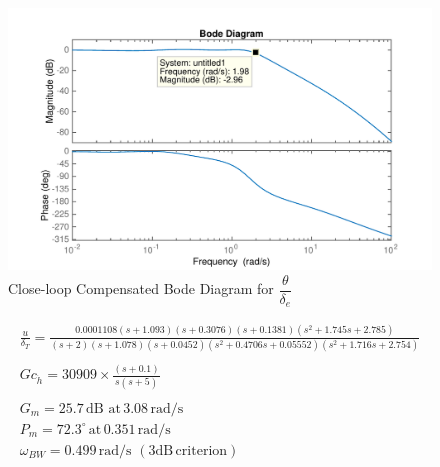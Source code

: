 \documentclass[11pt]{article}
\begin{document}
\begin{figure}[h!]
\begin{center}
\includegraphics[height=.4\textheight]{figures/close_comp_theta}
\caption{Close-loop Compensated Bode Diagram for $\dfrac{\theta}{\delta_e}$}
\end{center}
\end{figure}

\begin{gather*}
\frac{u}{\delta_T}=\frac{0.0001108 (s+1.093) (s+0.3076) (s+0.1381) (s^2 + 1.745s + 2.785)}{(s+2) (s+1.078) (s+0.0452) (s^2 + 0.4706s + 0.05552) (s^2 + 1.716s + 2.754)} \\
\\
\boxed{Gc_{\dot{h}} = 30909 \times \frac{(s+0.1)}{s(s+5)}} \\
\\
G_m=25.7\,\mathrm{dB\,\, at\,} 3.08 \,\mathrm{rad/s}  \\
P_m=72.3^{\circ}\, \mathrm{at}\, 0.351 \,\mathrm{rad/s} \\
\omega_{BW}=0.499\, \mathrm{rad/s}\,\mathrm{\,(3 dB\, criterion)}\\
\end{gather*}
\end{document}
